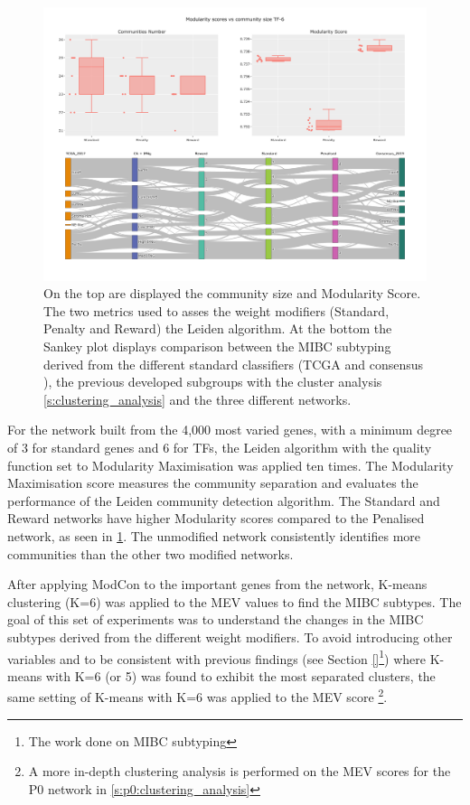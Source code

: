 \begin{figure}[!htb]    
    \centering
    \includegraphics[width=1.0\textwidth,keepaspectratio]{Sections/Network_I/Resources/Tum_network/LeidenMetrics_Sankey_TF-6.png}
    \caption{On the top are displayed the community size and Modularity Score. The two metrics used to asses the weight modifiers (Standard, Penalty and Reward) the Leiden algorithm. At the bottom the Sankey plot displays comparison between the MIBC subtyping derived from the different standard classifiers (TCGA \citep{Robertson2017-mg} and consensus \citep{Kamoun2020-tj}), the previous developed subgroups with the cluster analysis \cref{s:clustering_analysis} and the three different networks. }
    \label{fig:N_I:tum_leiden_modifiers}
\end{figure}


For the network built from the 4,000 most varied genes, with a minimum degree of 3 for standard genes and 6 for TFs, the Leiden algorithm with the quality function set to Modularity Maximisation was applied ten times. The Modularity Maximisation score measures the community separation and evaluates the performance of the Leiden community detection algorithm. The Standard and Reward networks have higher Modularity scores compared to the Penalised network, as seen in \cref{fig:N_I:tum_leiden_modifiers}. The unmodified network consistently identifies more communities than the other two modified networks.

After applying ModCon to the important genes from the network, K-means clustering (K=6) was applied to the MEV values to find the MIBC subtypes. The goal of this set of experiments was to understand the changes in the MIBC subtypes derived from the different weight modifiers. To avoid introducing other variables and to be consistent with previous findings (see Section \ref{}\footnote{The work done on MIBC subtyping}) where K-means with K=6 (or 5) was found to exhibit the most separated clusters, the same setting of K-means with K=6 was applied to the MEV score \footnote{A more in-depth clustering analysis is performed on the MEV scores for the P0 network in \cref{s:p0:clustering_analysis}}.


